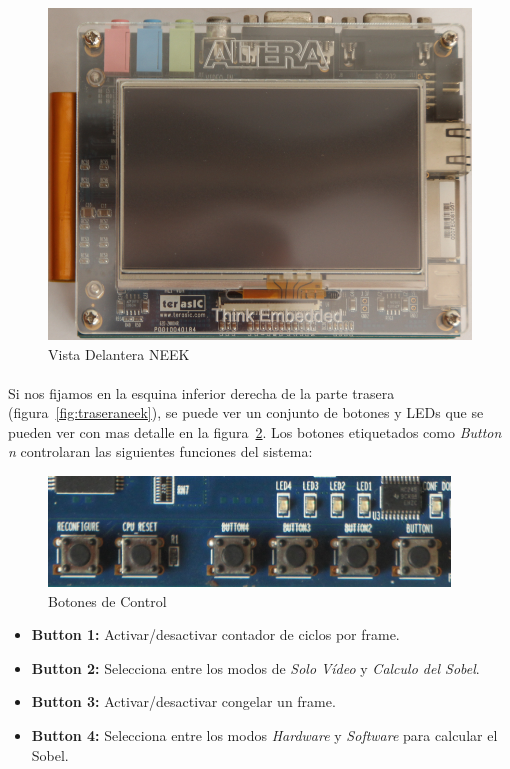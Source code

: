\documentclass[a4paper,12pt,titlepage,final]{book}
\begin{document}
\begin{figure}[p]
\centering
\includegraphics[width=\textwidth]{./figuras/NEEK/Delantera.png}
\caption{Vista Delantera NEEK}
\label{fig:delanteraneek}
\end{figure}

\paragraph{}
Si nos fijamos en la esquina inferior derecha de la parte trasera (figura~\ref{fig:traseraneek}), se puede ver un conjunto de botones y LEDs que se pueden ver con mas detalle en la figura~\ref{fig:botonescontrol}. Los botones etiquetados como \textit{Button n} controlaran las siguientes funciones del sistema:

\begin{figure}[p]
\centering
\includegraphics[width=0.95\textwidth]{./figuras/NEEK/BotonesSetup.png}
\caption{Botones de Control}
\label{fig:botonescontrol}
\end{figure}

\clearpage

\begin{itemize}
\item \textbf{Button 1:} Activar/desactivar contador de ciclos por frame.
\item \textbf{Button 2:} Selecciona entre los modos de \textit{Solo Vídeo} y \textit{Calculo del Sobel}.
\item \textbf{Button 3:} Activar/desactivar congelar un frame.
\item \textbf{Button 4:} Selecciona entre los modos \textit{Hardware} y \textit{Software} para calcular el Sobel. 
\end{itemize}
\end{document}
